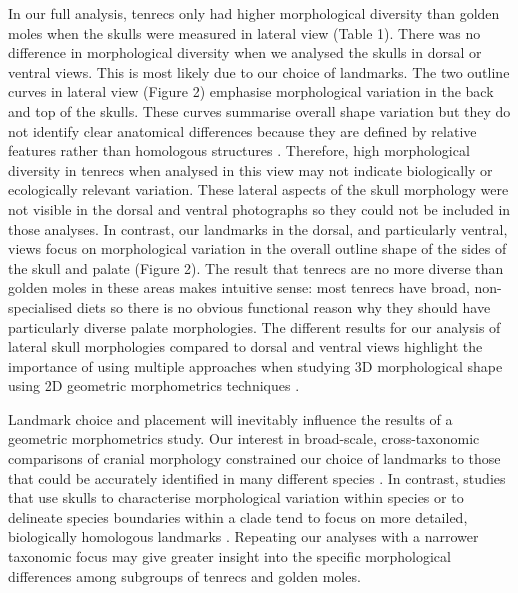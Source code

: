 \documentclass[12pt,a4paper]{article}
\begin{document}
	In our full analysis, tenrecs only had higher morphological diversity than golden moles when the skulls were measured in lateral view (Table 1). There was no difference in morphological diversity when we analysed the skulls in dorsal or ventral views. This is most likely due to our choice of landmarks. The two outline curves in lateral view (Figure 2) emphasise morphological variation in the back and top of the skulls. These curves summarise overall shape variation but they do not identify clear anatomical differences because they are defined by relative features rather than homologous structures \citep{Zelditch2012}. Therefore, high morphological diversity in tenrecs when analysed in this view may not indicate biologically or ecologically relevant variation.	
	These lateral aspects of the skull morphology were not visible in the dorsal and ventral photographs so they could not be included in those analyses. In contrast, our landmarks in the dorsal, and particularly ventral, views focus on morphological variation in the overall outline shape of the sides of the skull and palate (Figure 2). The result that tenrecs are no more diverse than golden moles in these areas makes intuitive sense: most tenrecs have broad, non-specialised diets \citep{Olson2013} so there is no obvious functional reason why they should have particularly diverse palate morphologies. The different results for our analysis of lateral skull morphologies compared to dorsal and ventral views highlight the importance of using multiple approaches when studying 3D morphological shape using 2D geometric morphometrics techniques \citep{Arnqvist1998}.
    
    Landmark choice and placement will inevitably influence the results of a geometric morphometrics study. Our interest in broad-scale, cross-taxonomic comparisons of cranial morphology constrained our choice of landmarks to those that could be accurately identified in many different species \citep[e.g.][]{Ruta2013, Goswami2011, Wroe2007}. In contrast, studies that use skulls to characterise morphological variation within species \citep[e.g.][]{Blagojevic2011, Bornholdt2008} or to delineate species boundaries within a clade \citep[e.g.][]{Panchetti2008} tend to focus on more detailed, biologically homologous landmarks \citep{Zelditch2012}. Repeating our analyses with a narrower taxonomic focus may give greater insight into the specific morphological differences among subgroups of tenrecs and golden moles.
	
\end{document}

